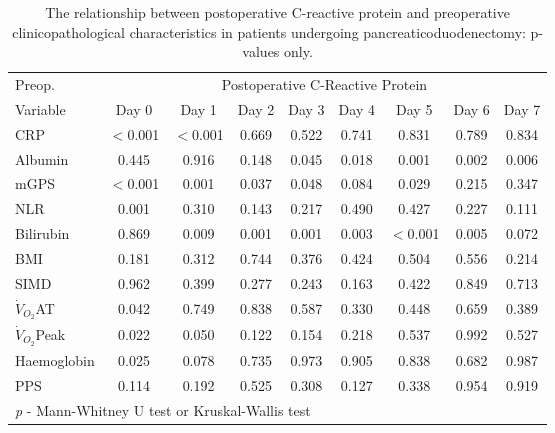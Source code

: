 \begin{table}[p]
	\caption{The relationship  between postoperative C-reactive protein and preoperative clinicopathological characteristics in patients undergoing pancreaticoduodenectomy: p-values only. }
	\label{table:sirs_crp_pvalues}
	\footnotesize
	\centering
	\renewcommand{\arraystretch}{1.2} %

	\begin{tabular}{|l | c c c c c c c c|}
		\hline
		Preop.              &         \multicolumn{8}{c|}{Postoperative C-Reactive Protein}          \\
		Variable            & Day 0    & Day 1    & Day 2 & Day 3 & Day 4 & Day 5    & Day 6 & Day 7 \\ \hline
		CRP                 & $<$0.001 & $<$0.001 & 0.669 & 0.522 & 0.741 & 0.831    & 0.789 & 0.834 \\
		Albumin             & 0.445    & 0.916    & 0.148 & 0.045 & 0.018 & 0.001    & 0.002 & 0.006 \\
		mGPS                & $<$0.001 & 0.001    & 0.037 & 0.048 & 0.084 & 0.029    & 0.215 & 0.347 \\
		NLR                 & 0.001    & 0.310    & 0.143 & 0.217 & 0.490 & 0.427    & 0.227 & 0.111 \\
		Bilirubin           & 0.869    & 0.009    & 0.001 & 0.001 & 0.003 & $<$0.001 & 0.005 & 0.072 \\
		BMI                 & 0.181    & 0.312    & 0.744 & 0.376 & 0.424 & 0.504    & 0.556 & 0.214 \\
		SIMD                & 0.962    & 0.399    & 0.277 & 0.243 & 0.163 & 0.422    & 0.849 & 0.713 \\
		$\dot{V}_{O_2}$AT   & 0.042    & 0.749    & 0.838 & 0.587 & 0.330 & 0.448    & 0.659 & 0.389 \\
		$\dot{V}_{O_2}$Peak & 0.022    & 0.050    & 0.122 & 0.154 & 0.218 & 0.537    & 0.992 & 0.527 \\
		Haemoglobin         & 0.025    & 0.078    & 0.735 & 0.973 & 0.905 & 0.838    & 0.682 & 0.987 \\
		PPS                 & 0.114    & 0.192    & 0.525 & 0.308 & 0.127 & 0.338    & 0.954 & 0.919 \\ \hline
		\multicolumn{9}{l}{\textit{p} - Mann-Whitney U test or Kruskal-Wallis test}
	\end{tabular}	
	\vspace{1cm}


\end{table}
